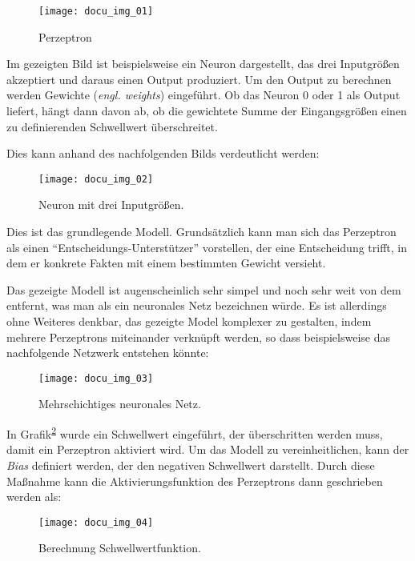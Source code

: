 \begin{figure}[h]
    \centering
    \texttt{[image: docu\_img\_01]}
    \caption{Perzeptron}
    \label{fig:perzeptron}
\end{figure}

Im gezeigten Bild ist beispielsweise ein Neuron dargestellt, das drei Inputgrößen akzeptiert und daraus einen Output
produziert. Um den Output zu berechnen werden Gewichte (\textit{engl. weights}) eingeführt. Ob das Neuron 0 oder 1 als
Output liefert, hängt dann davon ab, ob die gewichtete Summe der Eingangsgrößen einen zu definierenden Schwellwert
überschreitet.

Dies kann anhand des nachfolgenden Bilds verdeutlicht werden:

\begin{figure}[h]
    \centering
    \texttt{[image: docu\_img\_02]}
    \caption{Neuron mit drei Inputgrößen.}
    \label{fig:neuron-three-way}
\end{figure}

Dies ist das grundlegende Modell. Grundsätzlich kann man sich das Perzeptron als einen ``Entscheidungs-Unterstützer''
vorstellen, der eine Entscheidung trifft, in dem er konkrete Fakten mit einem bestimmten Gewicht versieht.

Das gezeigte Modell ist augenscheinlich sehr simpel und noch sehr weit von dem entfernt, was man als ein neuronales
Netz bezeichnen würde. Es ist allerdings ohne Weiteres denkbar, das gezeigte Model komplexer zu gestalten, indem
mehrere Perzeptrons miteinander verknüpft werden, so dass beispielsweise das nachfolgende Netzwerk entstehen könnte:

\begin{figure}[h]
    \centering
    \texttt{[image: docu\_img\_03]}
    \caption{Mehrschichtiges neuronales Netz.}
    \label{fig:multi-layer-net}
\end{figure}



In Grafik\textsuperscript{\ref{fig:neuron-three-way}} wurde ein Schwellwert eingeführt, der überschritten werden muss, damit ein Perzeptron
aktiviert wird. Um das Modell zu vereinheitlichen, kann der \textit{Bias} definiert werden, der den
negativen Schwellwert darstellt. Durch diese Maßnahme kann die Aktivierungsfunktion des Perzeptrons dann geschrieben
werden als:

\begin{figure}[h]
    \centering
    \texttt{[image: docu\_img\_04]}
    \caption{Berechnung Schwellwertfunktion.}
    \label{fig:bias-calculation}
\end{figure}

